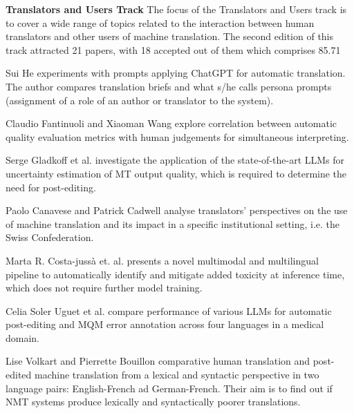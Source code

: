 {\bf Translators and Users Track}
The focus of the Translators and Users track is to cover a wide range of topics related to the interaction between human translators and other users of machine translation. The second edition of this track attracted 21 papers, with 18 accepted out of them which comprises 85.71%

Sui He experiments with prompts applying ChatGPT for automatic translation. The author compares translation briefs and what s/he calls persona prompts (assignment of a role of an author or translator to the system). 

Claudio Fantinuoli and Xiaoman Wang explore correlation between automatic quality evaluation metrics with human judgements for simultaneous interpreting. 

Serge Gladkoff et al. investigate the application of the state-of-the-art LLMs for uncertainty estimation of MT output quality, which is required to determine the need for post-editing.

Paolo Canavese and Patrick Cadwell analyse translators’ perspectives on the use of machine translation and its impact in a specific institutional setting, i.e. the Swiss Confederation.
    
Marta R. Costa-jussà et. al. presents a novel multimodal and multilingual pipeline to automatically identify and mitigate added toxicity at inference time, which does not require further model training.

Celia Soler Uguet et al. compare performance of various LLMs for automatic post-editing and MQM error annotation across four languages in a medical domain.

Lise Volkart and Pierrette Bouillon comparative human translation and post-edited machine translation from a lexical and syntactic perspective in two language pairs: English-French ad German-French. Their aim is to find out if NMT systems produce lexically and syntactically poorer translations.

